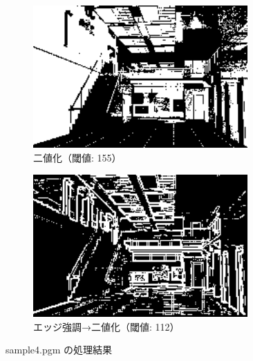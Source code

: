 \documentclass[a4paper,12pt]{jsarticle}
\begin{document}
\begin{figure}[!htbp]
\begin{subfigure}[b]{0.45\textwidth}
    \centering
    \includegraphics[width=0.9\textwidth]{./images/binarized_sample4_binary.png}
    \caption{二値化（閾値: 155）}
\end{subfigure}
\hfill
\begin{subfigure}[b]{0.45\textwidth}
    \centering
    \includegraphics[width=0.9\textwidth]{./images/combined_sample4_combined.png}
    \caption{エッジ強調→二値化（閾値: 112）}
\end{subfigure}
\caption{sample4.pgm の処理結果}
\label{fig:sample4}
\end{figure}
\end{document}
